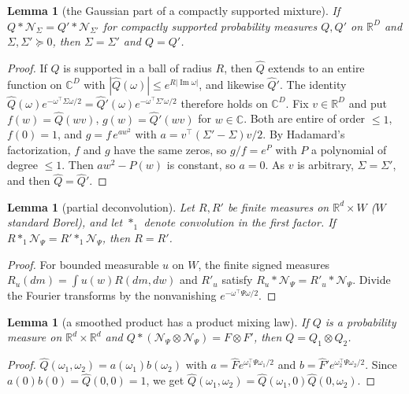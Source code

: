 \documentclass[11pt]{article}
\newtheorem{lemma}[theorem]{Lemma}
\theoremstyle{definition}
\newcommand{\R}{\mathbb R}
\begin{document}
\begin{lemma}[the Gaussian part of a compactly supported mixture]\label{lem:hadamard}
If $Q*\mathcal N_\Sigma=Q'*\mathcal N_{\Sigma'}$ for compactly supported probability measures $Q,Q'$ on
$\R^D$ and $\Sigma,\Sigma'\succeq0$, then $\Sigma=\Sigma'$ and $Q=Q'$.
\end{lemma}
\begin{proof}
If $Q$ is supported in a ball of radius $R$, then $\hat Q$ extends to an entire function on $\mathbb C^D$ with
$|\hat Q(\omega)|\le e^{R|\operatorname{Im}\omega|}$, and likewise $\hat Q'$. The identity
$\hat Q(\omega)e^{-\omega^{\!\top}\Sigma\omega/2}=\hat Q'(\omega)e^{-\omega^{\!\top}\Sigma'\omega/2}$ therefore holds on
$\mathbb C^D$. Fix $v\in\R^D$ and put $f(w)=\hat Q(wv)$, $g(w)=\hat Q'(wv)$ for $w\in\mathbb C$. Both are
entire of order $\le1$, $f(0)=1$, and $g=f\,e^{aw^2}$ with $a=v^{\!\top}(\Sigma'-\Sigma)v/2$. By Hadamard's
factorization, $f$ and $g$ have the same zeros, so $g/f=e^{P}$ with $P$ a polynomial of degree $\le1$.
Then $aw^2-P(w)$ is constant, so $a=0$. As $v$ is arbitrary, $\Sigma=\Sigma'$, and then $\hat Q=\hat Q'$.
\end{proof}

\begin{lemma}[partial deconvolution]\label{lem:partial}
Let $R,R'$ be finite measures on $\R^d\times W$ ($W$ standard Borel), and let $*_1$ denote convolution in
the first factor. If $R*_1\mathcal N_\Psi=R'*_1\mathcal N_\Psi$, then $R=R'$.
\end{lemma}
\begin{proof}
For bounded measurable $u$ on $W$, the finite signed measures $R_u(dm)=\int u(w)R(dm,dw)$ and $R'_u$
satisfy $R_u*\mathcal N_\Psi=R'_u*\mathcal N_\Psi$. Divide the Fourier transforms by the nonvanishing
$e^{-\omega^{\!\top}\Psi\omega/2}$.
\end{proof}

\begin{lemma}[a smoothed product has a product mixing law]\label{lem:product}
If $Q$ is a probability measure on $\R^d\times\R^d$ and $Q*(\mathcal N_\Psi\otimes\mathcal N_\Psi)=F\otimes F'$,
then $Q=Q_1\otimes Q_2$.
\end{lemma}
\begin{proof}
$\hat Q(\omega_1,\omega_2)=a(\omega_1)b(\omega_2)$ with $a=\hat Fe^{\omega_1^{\!\top}\Psi\omega_1/2}$ and
$b=\hat F'e^{\omega_2^{\!\top}\Psi\omega_2/2}$. Since $a(0)b(0)=\hat Q(0,0)=1$, we get
$\hat Q(\omega_1,\omega_2)=\hat Q(\omega_1,0)\hat Q(0,\omega_2)$.
\end{proof}
\end{document}
